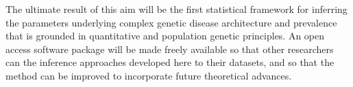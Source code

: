 \documentclass[11pt]{article}
\begin{document}
The ultimate result of this aim will be the first statistical framework for inferring the parameters underlying complex genetic disease architecture and prevalence that is grounded in quantitative and population genetic principles. An open access software package will be made freely available so that other researchers can the inference approaches developed here to their datasets, and so that the method can be improved to incorporate future theoretical advances.


\end{document}
